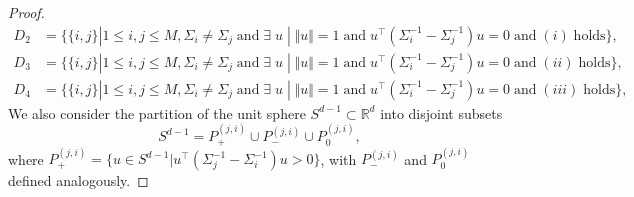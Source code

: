 \begin{proof}
\begin{align*}
   D_2 &= \{\{i, j\}|1\leq i, j\leq M, \Sigma_i\neq \Sigma_j \;\text{and}\; \exists\; u\; |\;\Vert u\Vert = 1\;\text{and}\; u^\intercal\left(\Sigma_i^{-1}-\Sigma_j^{-1}\right)u = 0\;\text{and}\; (i)\;\text{holds}\},\\
   D_3 &= \{\{i, j\}|1\leq i, j\leq M, \Sigma_i\neq \Sigma_j \;\text{and}\; \exists\; u\; |\;\Vert u\Vert = 1\;\text{and}\; u^\intercal\left(\Sigma_i^{-1}-\Sigma_j^{-1}\right)u = 0\;\text{and}\; (ii)\;\text{holds}\},\\
   D_4 &= \{\{i, j\}|1\leq i, j\leq M, \Sigma_i\neq \Sigma_j \;\text{and}\; \exists\; u\; |\;\Vert u\Vert = 1\;\text{and}\; u^\intercal\left(\Sigma_i^{-1}-\Sigma_j^{-1}\right)u = 0\;\text{and}\; (iii)\;\text{holds}\},
\end{align*}
We also consider the partition of the unit sphere 
$S^{d-1}\subset \mathbb{R}^d$ into disjoint subsets
\begin{equation*}
    S^{d-1} = P_{+}^{(j, i)} \cup P_{-}^{(j, i)} \cup P_{0}^{(j, i)},
\end{equation*}
where $P_{+}^{(j, i)} = \{u\in S^{d-1}| u^{\intercal}(\Sigma_j^{-1}-\Sigma_i^{-1})u>0\}$, with $P_{-}^{(j, i)} $ and $ P_{0}^{(j, i)}$ defined analogously. 


\end{proof}
